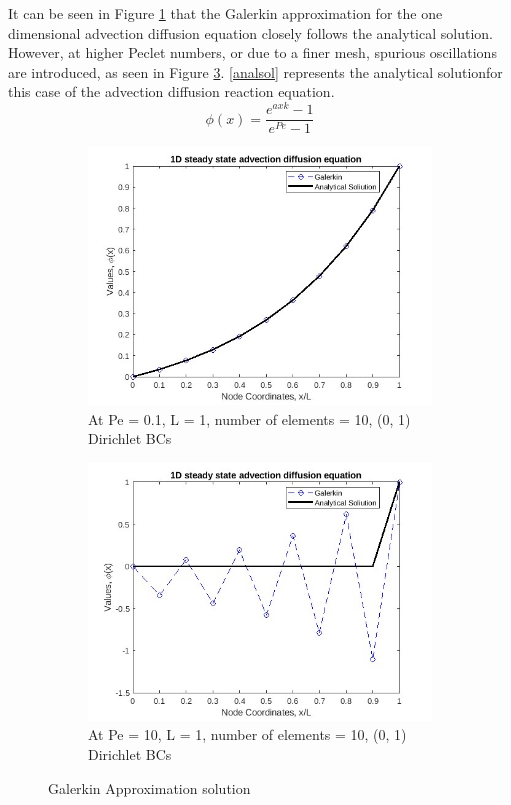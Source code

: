 \documentclass[12pt, oneside]{article}
\begin{document}
It can be seen in Figure \ref{fig-gal-1} that the Galerkin approximation for the one dimensional advection diffusion equation closely follows the analytical solution. However, at higher Peclet numbers, or due to a finer mesh, spurious oscillations are introduced, as seen in Figure \ref{fig-gal-2}. \ref{analsol} represents the analytical solutionfor this case of the advection diffusion reaction equation.
\begin{equation} \label{analsol}
    \phi(x) =  \frac{e^{a x k} -1}{e^{Pe} - 1} 
\end{equation} 
\begin{figure}[!h]
    \captionsetup[subfigure]{justification=centering}
    \centering
    \begin{subfigure}[!h]{0.45\textwidth}
	\includegraphics[width=\textwidth]{pe01_no_source.jpg}
	\caption{At Pe = 0.1, L = 1, number of elements = 10, (0, 1) Dirichlet BCs}
	\label{fig-gal-1}
    \end{subfigure}
    \hfill
    \begin{subfigure}[!h]{0.45\textwidth}
	\includegraphics[width=\textwidth]{pe10_no_source.jpg}
	\caption{At Pe = 10, L = 1, number of elements = 10, (0, 1) Dirichlet BCs}
	\label{fig-gal-2}
    \end{subfigure}
    \caption{Galerkin Approximation solution}
\end{figure}
\end{document}
